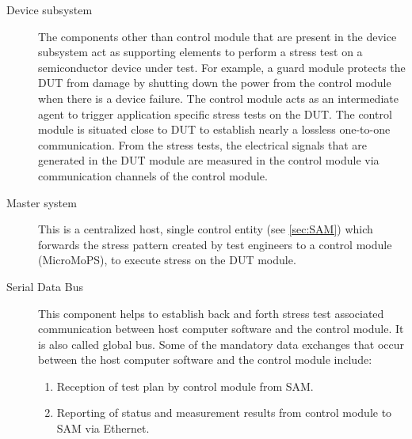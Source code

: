 \begin{description}
  \item[Device subsystem] The components other than control module that are present in the device subsystem act as supporting elements to perform a stress test on a semiconductor device under test. 
  For example, a guard module protects the \acrshort{DUT} from damage by shutting down the power from the control module when there is a device failure. 
  The control module acts as an intermediate agent to trigger application specific stress tests on the \acrshort{DUT}. 
  The control module is situated close to \acrshort{DUT} to establish nearly a lossless one-to-one communication. 
  From the stress tests, the electrical signals that are generated in the \acrshort{DUT} module are measured in the control module via communication channels of the control module.  %
  \item[Master system] This is a centralized host, single control entity (see \cref{sec:SAM}) which forwards the stress pattern created by test engineers to a control module (MicroMoPS), to execute stress on the \acrshort{DUT} module. %
  \item[Serial Data Bus] This component helps to establish back and forth stress test associated communication between host computer software and the control module. 
  It is also called global bus. 
  Some of the mandatory data exchanges that occur between the host computer software and the control module include: 
	\begin{enumerate}
	\item Reception of test plan by control module from SAM.
	\item Reporting of status and measurement results from control module to SAM via Ethernet. 
	\end{enumerate}

\end{description}
